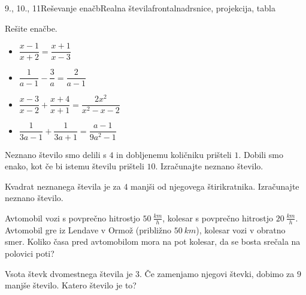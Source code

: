 \begin{priprava}{9., 10., 11}{}{Reševanje enačb}{Realna števila}{frontalna}{drsnice, projekcija, tabla}
        
            \begin{naloga}
                Rešite enačbe.
                \begin{itemize}
                        \item $\dfrac{x-1}{x+2}=\dfrac{x+1}{x-3}$ 
                        \item $\dfrac{1}{a-1}-\dfrac{3}{a}=\dfrac{2}{a-1}$ 
                        \item $\dfrac{x-3}{x-2}+\dfrac{x+4}{x+1}=\dfrac{2x^2}{x^2-x-2}$ 
                        \item $\dfrac{1}{3a-1}+\dfrac{1}{3a+1}=\dfrac{a-1}{9a^2-1}$ 
                \end{itemize}
            \end{naloga}
        


        
            \begin{naloga}
                Neznano število smo delili s $4$ in dobljenemu količniku prišteli $1$. 
                Dobili smo enako, kot če bi istemu številu prišteli $10$. Izračunajte neznano število.
                
            \end{naloga}

            \begin{naloga}
                Kvadrat neznanega števila je za $4$ manjši od njegovega štirikratnika. Izračunajte neznano število.
                
            \end{naloga}

        


        
            \begin{naloga}
                Avtomobil vozi s povprečno hitrostjo $50~\frac{km}{h}$, kolesar s povprečno hitrostjo $20~\frac{km}{h}$.
                Avtomobil gre iz Lendave v Ormož (približno $50~km$), kolesar vozi v obratno smer. 
                Koliko časa pred avtomobilom mora na pot kolesar, da se bosta srečala na polovici poti?
                
            \end{naloga}

            \begin{naloga}
                Vsota števk dvomestnega števila je $3$. Če zamenjamo njegovi števki, dobimo za $9$ manjše število. Katero število je to?
                
            \end{naloga}


\end{priprava}
